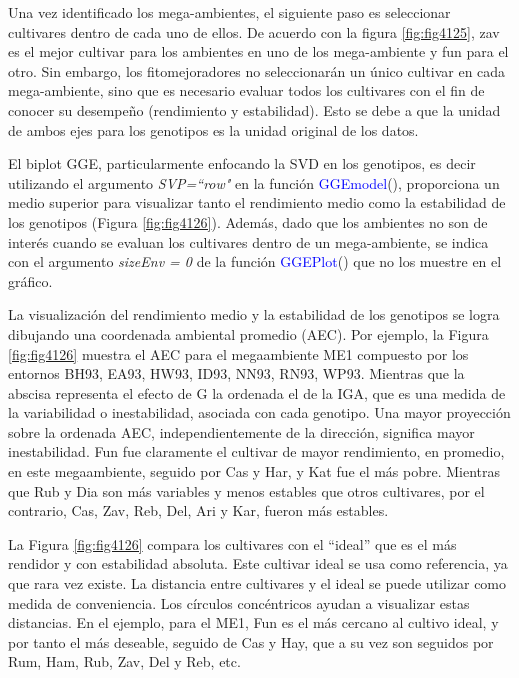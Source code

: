 Una vez identificado los mega-ambientes, el siguiente paso es seleccionar cultivares dentro de cada uno de ellos. De acuerdo con la figura  \ref{fig:fig4125}, zav es el mejor cultivar para los ambientes en uno de los mega-ambiente y fun para el otro. Sin embargo, los fitomejoradores no seleccionarán un único cultivar en cada mega-ambiente, sino que es necesario evaluar todos los cultivares con el fin de conocer su desempeño (rendimiento y estabilidad). Esto se debe a que la unidad de ambos ejes para los genotipos es la unidad original de los datos. 

El biplot GGE, particularmente enfocando la SVD en los genotipos, es decir utilizando el argumento \emph{SVP=``row"} en la función \textcolor{blue}{GGEmodel}(), proporciona un medio superior para visualizar tanto el rendimiento medio como la estabilidad de los genotipos (Figura \ref{fig:fig4126}). Además, dado que los ambientes no son de interés cuando se evaluan los cultivares dentro de un mega-ambiente, se indica con el argumento \emph{sizeEnv = 0} de la función \textcolor{blue}{GGEPlot}() que no los muestre en el gráfico.


La visualización del rendimiento medio y la estabilidad de los genotipos se logra dibujando una coordenada ambiental promedio (AEC). Por ejemplo, la Figura \ref{fig:fig4126}  muestra el AEC para el megaambiente ME1 compuesto por los entornos BH93, EA93, HW93, ID93, NN93, RN93, WP93. Mientras que la abscisa representa el efecto de G la ordenada el de la IGA, que es una medida de la variabilidad o inestabilidad, asociada con cada genotipo. Una mayor proyección sobre la ordenada AEC, independientemente de la dirección, significa mayor inestabilidad. Fun fue claramente el cultivar de mayor rendimiento, en promedio, en este megaambiente, seguido por Cas y Har, y Kat fue el más pobre. Mientras que Rub y Dia son más variables y menos estables que otros cultivares, por el contrario, Cas, Zav, Reb, Del, Ari y Kar, fueron más estables. 

La Figura \ref{fig:fig4126} compara los cultivares con el ``ideal” que es el más rendidor y con estabilidad absoluta. Este cultivar ideal se usa como referencia, ya que rara vez existe. La distancia entre cultivares y el ideal se puede utilizar como medida de conveniencia. Los círculos concéntricos ayudan a visualizar estas distancias. En el ejemplo, para el ME1, Fun es el más cercano al cultivo ideal, y por tanto el más deseable, seguido de Cas y Hay, que a su vez son seguidos por Rum, Ham, Rub, Zav, Del y Reb, etc. 


